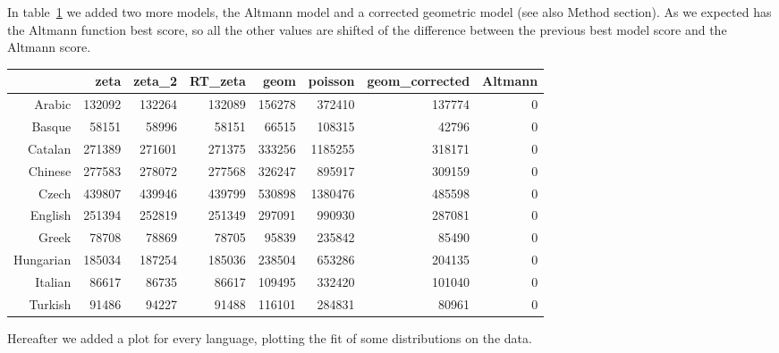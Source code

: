 \documentclass[paper=a4, fontsize=11pt]{scrartcl} %
\theoremstyle{plain}
\begin{document}
In table~\ref{diffAIC_A} we added two more models, the Altmann model and a corrected geometric model (see also Method section). As we expected has the Altmann function best score, so all the other values are shifted of the difference between the previous best model score and the Altmann score.

\begin{table}[H]
\centering
{} \label{diffAIC_A}
\begin{tabular}{rrrrrrrr}
  \hline
 & zeta & zeta\_2 & RT\_zeta & geom & poisson & geom\_corrected & Altmann \\ 
  \hline
Arabic & 132092 & 132264 & 132089 & 156278 & 372410 & 137774 &   0 \\ 
  Basque & 58151 & 58996 & 58151 & 66515 & 108315 & 42796 &   0 \\ 
  Catalan & 271389 & 271601 & 271375 & 333256 & 1185255 & 318171 &   0 \\ 
  Chinese & 277583 & 278072 & 277568 & 326247 & 895917 & 309159 &   0 \\ 
  Czech & 439807 & 439946 & 439799 & 530898 & 1380476 & 485598 &   0 \\ 
  English & 251394 & 252819 & 251349 & 297091 & 990930 & 287081 &   0 \\ 
  Greek & 78708 & 78869 & 78705 & 95839 & 235842 & 85490 &   0 \\ 
  Hungarian & 185034 & 187254 & 185036 & 238504 & 653286 & 204135 &   0 \\ 
  Italian & 86617 & 86735 & 86617 & 109495 & 332420 & 101040 &   0 \\ 
  Turkish & 91486 & 94227 & 91488 & 116101 & 284831 & 80961 &   0 \\ 
   \hline
\end{tabular}
\end{table}

Hereafter we added a plot for every language, plotting the fit of some distributions on the data.
\end{document}
